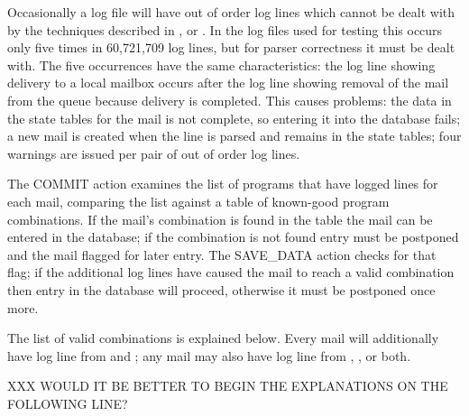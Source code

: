 Occasionally a log file will have out of order log lines which cannot be
dealt with by the techniques described in ,  or .  In the \numberOFlogFILES{} log files used for testing this
occurs only five times in 60,721,709 log lines, but for parser correctness
it must be dealt with.  The five occurrences have the same characteristics:
the  log line showing delivery to a local mailbox occurs
after the  log line showing removal of the mail from the queue
because delivery is completed.  This causes problems: the data in the state
tables for the mail is not complete, so entering it into the database
fails; a new mail is created when the  line is parsed and
remains in the state tables; four warnings are issued per pair of out of
order log lines.

The COMMIT action examines the list of programs that have logged lines for
each mail, comparing the list against a table of known-good program
combinations.  If the mail's combination is found in the table the mail can
be entered in the database; if the combination is not found entry must be
postponed and the mail flagged for later entry.  The SAVE\_DATA action
checks for that flag; if the additional log lines have caused the mail to
reach a valid combination then entry in the database will proceed,
otherwise it must be postponed once more.

The list of valid combinations is explained below.  Every mail will
additionally have log line from  and ; any
mail may also have log line from , , or
both.

XXX WOULD IT BE BETTER TO BEGIN THE EXPLANATIONS ON THE FOLLOWING LINE\@?

